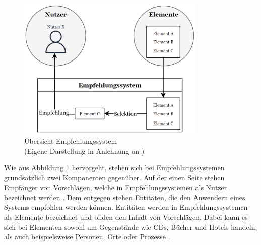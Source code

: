 \begin{figure}[H]
    \centering
	\includegraphics[width=0.8\textwidth]{gfx/komponenten-empfehlungssystem.png}
	\caption[Übersicht Empfehlungssystem]{Übersicht Empfehlungssystem\\
	(Eigene Darstellung in Anlehnung an \cite[S. 2]{klahold:book})}
	\label{fig:empfehlungssysteme:einführung:abb1}
\end{figure}

Wie aus Abbildung \ref{fig:empfehlungssysteme:einführung:abb1} hervorgeht, stehen sich bei Empfehlungssystemen grundsätzlich zwei Komponenten gegenüber.
Auf der einen Seite stehen Empfänger von Vorschlägen, welche in Empfehlungssystemen als Nutzer bezeichnet werden \cite[S. 8]{ricci:inbook}.
Dem entgegen stehen Entitäten, die den Anwendern eines Systems empfohlen werden können.
Entitäten werden in Empfehlungssystemen als Elemente bezeichnet und bilden den Inhalt von Vorschlägen.
Dabei kann es sich bei Elementen sowohl um Gegenstände wie CDs, Bücher und Hotels handeln, als auch beispielsweise Personen, Orte oder Prozesse \cite[S. 4]{klahold:book}.

